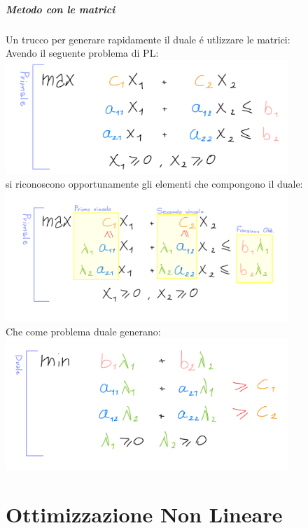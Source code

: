 \documentclass[12pt, a4paper, openany]{book}
\begin{document}
\paragraph{Metodo con le matrici}
Un trucco per generare rapidamente il duale é utlizzare le matrici:\\
Avendo il seguente problema di PL:\\
\includegraphics[width=0.8\textwidth]{dualita-cheatsheet-0.jpeg}\\
si riconoscono opportunamente gli elementi che compongono il duale:\\
\includegraphics[width=0.8\textwidth]{dualita-cheatsheet-1.jpeg}\\
Che come problema duale generano: \\
\includegraphics[width=0.8\textwidth]{dualita-cheatsheet-2.jpeg}   
	
\chapter{Ottimizzazione Non Lineare}
\end{document}
